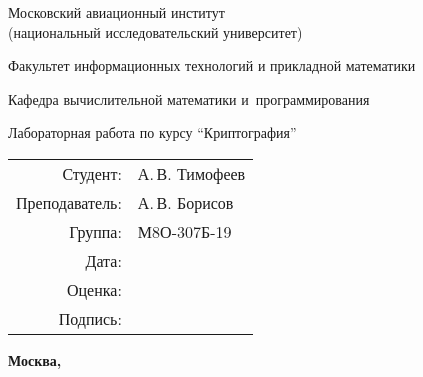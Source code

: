 \begin{titlepage}
\begin{center}
\bfseries

{\Large Московский авиационный институт\\ (национальный исследовательский университет)

}

\vspace{48pt}

{\large Факультет информационных технологий и прикладной математики
}

\vspace{36pt}

{\large Кафедра вычислительной математики и~программирования

}


\vspace{48pt}

Лабораторная работа  по курсу \enquote{Криптография}

\end{center}

\vspace{72pt}

\begin{flushright}
\begin{tabular}{rl}
Студент: & А.\,В. Тимофеев \\
Преподаватель: & А.\,В. Борисов \\
Группа: & М8О-307Б-19 \\
Дата: & \\
Оценка: & \\
Подпись: & \\
\end{tabular}
\end{flushright}

\vfill

\begin{center}
\bfseries
Москва, \the\year
\end{center}
\end{titlepage}

\pagebreak